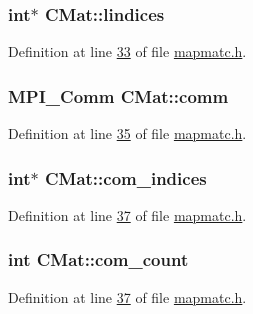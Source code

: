 \hypertarget{structCMat_aab35bdadef0a9b8393bee5854c37fb1c}{
\subsubsection[{lindices}]{\setlength{\rightskip}{0pt plus 5cm}int$\ast$ C\-Mat\-::lindices}}\label{structCMat_aab35bdadef0a9b8393bee5854c37fb1c}


Definition at line \hyperlink{mapmatc_8h_source_l00033}{33} of file \hyperlink{mapmatc_8h_source}{mapmatc.\-h}.

\hypertarget{structCMat_a8604ef4463b1862237ee574bd8d2fdfb}{
\subsubsection[{comm}]{\setlength{\rightskip}{0pt plus 5cm}M\-P\-I\-\_\-\-Comm C\-Mat\-::comm}}\label{structCMat_a8604ef4463b1862237ee574bd8d2fdfb}


Definition at line \hyperlink{mapmatc_8h_source_l00035}{35} of file \hyperlink{mapmatc_8h_source}{mapmatc.\-h}.

\hypertarget{structCMat_a5a220180ab228481a631a01c9b74cbef}{
\subsubsection[{com\-\_\-indices}]{\setlength{\rightskip}{0pt plus 5cm}int$\ast$ C\-Mat\-::com\-\_\-indices}}\label{structCMat_a5a220180ab228481a631a01c9b74cbef}


Definition at line \hyperlink{mapmatc_8h_source_l00037}{37} of file \hyperlink{mapmatc_8h_source}{mapmatc.\-h}.

\hypertarget{structCMat_ab75ef04d87dc9e4dc62adb95ea0c729a}{
\subsubsection[{com\-\_\-count}]{\setlength{\rightskip}{0pt plus 5cm}int C\-Mat\-::com\-\_\-count}}\label{structCMat_ab75ef04d87dc9e4dc62adb95ea0c729a}


Definition at line \hyperlink{mapmatc_8h_source_l00037}{37} of file \hyperlink{mapmatc_8h_source}{mapmatc.\-h}.

